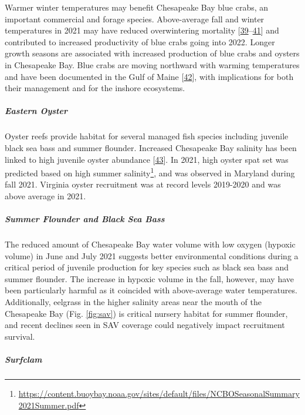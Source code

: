 \documentclass[
  10pt,
]{article}
\begin{document}
Warmer winter temperatures may benefit Chesapeake Bay blue crabs, an
important commercial and forage species. Above-average fall and winter
temperatures in 2021 may have reduced overwintering mortality
{[}\protect\hyperlink{ref-bauer_temperature-_2010}{39}--\protect\hyperlink{ref-rome_linking_2005}{41}{]}
and contributed to increased productivity of blue crabs going into 2022.
Longer growth seasons are associated with increased production of blue
crabs and oysters in Chesapeake Bay. Blue crabs are moving northward
with warming temperatures and have been documented in the Gulf of Maine
{[}\protect\hyperlink{ref-johnson_savory_2015}{42}{]}, with implications
for both their management and for the inshore ecosystems.

\hypertarget{eastern-oyster}{%
\subparagraph{\texorpdfstring{\emph{Eastern
Oyster}}{Eastern Oyster}}\label{eastern-oyster}}

Oyster reefs provide habitat for several managed fish species including
juvenile black sea bass and summer flounder. Increased Chesapeake Bay
salinity has been linked to high juvenile oyster abundance
{[}\protect\hyperlink{ref-kimmel_relationship_2014}{43}{]}. In 2021,
high oyster spat set was predicted based on high summer
salinity\footnote{\url{https://content.buoybay.noaa.gov/sites/default/files/NCBOSeasonalSummary2021Summer.pdf}},
and was observed in Maryland during fall 2021. Virginia oyster
recruitment was at record levels 2019-2020 and was above average in
2021.

\hypertarget{summer-flounder-and-black-sea-bass}{%
\subparagraph{\texorpdfstring{\emph{Summer Flounder and Black Sea
Bass}}{Summer Flounder and Black Sea Bass}}\label{summer-flounder-and-black-sea-bass}}

The reduced amount of Chesapeake Bay water volume with low oxygen
(hypoxic volume) in June and July 2021 suggests better environmental
conditions during a critical period of juvenile production for key
species such as black sea bass and summer flounder. The increase in
hypoxic volume in the fall, however, may have been particularly harmful
as it coincided with above-average water temperatures. Additionally,
eelgrass in the higher salinity areas near the mouth of the Chesapeake
Bay (Fig. \ref{fig:sav}) is critical nursery habitat for summer
flounder, and recent declines seen in SAV coverage could negatively
impact recruitment survival.

\hypertarget{surfclam}{%
\subparagraph{\texorpdfstring{\emph{Surfclam}}{Surfclam}}\label{surfclam}}
\end{document}
